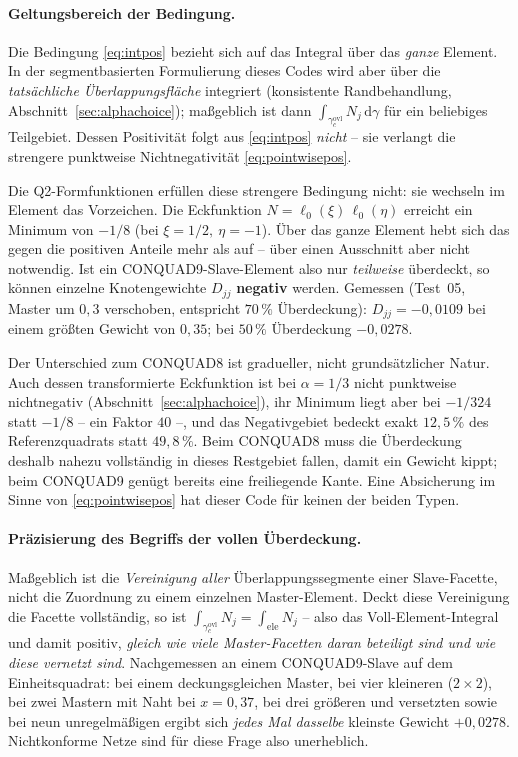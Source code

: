 \documentclass[a4paper,11pt]{article}
\def\tfrac#1#2{#1/#2}%
\def\tilde#1{#1}%
\begin{document}
\paragraph{Geltungsbereich der Bedingung.} Die Bedingung \eqref{eq:intpos} bezieht
sich auf das Integral über das \emph{ganze} Element. In der segmentbasierten Formulierung dieses
Codes wird aber über die \emph{tatsächliche Überlappungsfläche} integriert (konsistente
Randbehandlung, Abschnitt~\ref{sec:alphachoice}); maßgeblich ist dann
$\int_{\gamma_c^{\text{ovl}}}\tilde N_j\,\mathrm d\gamma$ für ein beliebiges Teilgebiet. Dessen
Positivität folgt aus \eqref{eq:intpos} \emph{nicht} -- sie verlangt die strengere punktweise
Nichtnegativität \eqref{eq:pointwisepos}.

Die Q2-Formfunktionen erfüllen diese strengere Bedingung nicht: sie wechseln im Element das
Vorzeichen. Die Eckfunktion $N=\ell_0(\xi)\,\ell_0(\eta)$ erreicht ein Minimum von $-\tfrac18$
(bei $\xi=\tfrac12,\ \eta=-1$). Über das ganze Element hebt sich das gegen die positiven Anteile
mehr als auf -- über einen Ausschnitt aber nicht notwendig. Ist ein CONQUAD9-Slave-Element also nur
\emph{teilweise} überdeckt, so können einzelne Knotengewichte $\tilde D_{jj}$ \textbf{negativ}
werden. Gemessen (Test~05, Master um $0{,}3$ verschoben, entspricht $70\,\%$ Überdeckung):
$\tilde D_{jj}=-0{,}0109$ bei einem größten Gewicht von $0{,}35$; bei $50\,\%$ Überdeckung
$-0{,}0278$.

Der Unterschied zum CONQUAD8 ist gradueller, nicht grundsätzlicher Natur. Auch dessen
transformierte Eckfunktion ist bei $\alpha=\tfrac13$ nicht punktweise nichtnegativ
(Abschnitt~\ref{sec:alphachoice}), ihr Minimum liegt aber bei $-\tfrac{1}{324}$ statt $-\tfrac18$
-- ein Faktor $40$ --, und das Negativgebiet bedeckt exakt $12{,}5\,\%$ des Referenzquadrats statt
$49{,}8\,\%$. Beim CONQUAD8 muss die
Überdeckung deshalb nahezu vollständig in dieses Restgebiet fallen, damit ein Gewicht kippt; beim
CONQUAD9 genügt bereits eine freiliegende Kante. Eine Absicherung im Sinne von
\eqref{eq:pointwisepos} hat dieser Code für keinen der beiden Typen.

\paragraph{Präzisierung des Begriffs der vollen Überdeckung.} Maßgeblich ist die \emph{Vereinigung aller}
Überlappungssegmente einer Slave-Facette, nicht die Zuordnung zu einem einzelnen Master-Element.
Deckt diese Vereinigung die Facette vollständig, so ist $\int_{\gamma_c^{\text{ovl}}}\tilde N_j
= \int_{\text{ele}}\tilde N_j$ -- also das Voll-Element-Integral und damit positiv, \emph{gleich
wie viele Master-Facetten daran beteiligt sind und wie diese vernetzt sind}. Nachgemessen an einem
CONQUAD9-Slave auf dem Einheitsquadrat: bei einem deckungsgleichen Master, bei vier kleineren
($2\times2$), bei zwei Mastern mit Naht bei $x=0{,}37$, bei drei größeren und versetzten sowie bei
neun unregelmäßigen ergibt sich \emph{jedes Mal dasselbe} kleinste Gewicht $+0{,}0278$.
Nichtkonforme Netze sind für diese Frage also unerheblich.
\end{document}
